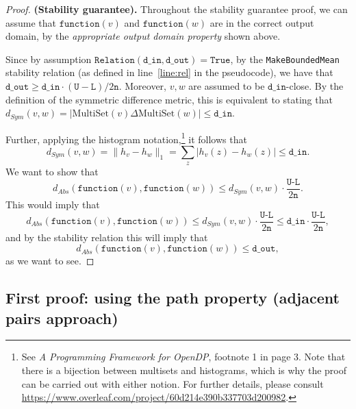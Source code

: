 \documentclass[11pt,a4paper]{article}
\theoremstyle{definition}
\newcommand{\MultiSet}{\mathrm{MultiSet}}
\newcommand{\din}{\texttt{d\_in}}
\newcommand{\dout}{\texttt{d\_out}}
\newcommand{\Relation}{\texttt{Relation}}
\newcommand{\U}{\texttt{U}}
\newcommand{\True}{\texttt{True}}
\newcommand{\function}{\texttt{function}}
\begin{document}
\begin{proof}
    \smallskip
    \textbf{(Stability guarantee).} Throughout the stability guarantee proof, we can assume that $\function(v)$ and $\function(w)$ are in the correct output domain, by the \textit{appropriate output domain property} shown above. 
    
    Since by assumption $\Relation(\din, \dout) = \True$, by the \texttt{MakeBoundedMean} stability relation (as defined in line~\ref{line:rel} in the pseudocode), we have that $\dout \geq \din \cdot (\U - \texttt{L})/2\texttt{n}$. Moreover, $v, w$ are assumed to be $\din$-close. By the definition of the symmetric difference metric, this is equivalent to stating that $d_{Sym}(v, w) = |\MultiSet(v) \Delta \MultiSet(w)| \leq \din$.

    Further, applying the histogram notation,\footnote{See \textit{A Programming Framework for OpenDP}, footnote 1 in page 3. Note that there is a bijection between multisets and histograms, which is why the proof can be carried out with either notion. For further details, please consult \url{https://www.overleaf.com/project/60d214e390b337703d200982}.}  it follows that
    \[
        d_{Sym}(v, w) = \lVert h_{v} - h_{w}\rVert_1 = \sum_z |h_v(z) - h_w(z)| \leq \din.
    \]
    We want to show that
    \[
        d_{Abs}(\function(v), \function(w)) \leq d_{Sym}(v, w) \cdot \dfrac{\texttt{U-L}}{2\texttt{n}}.
    \]
    This would imply that
    \begin{equation}\label{eq:abs1}
        d_{Abs}(\function(v), \function(w)) \leq d_{Sym}(v, w) \cdot \dfrac{\texttt{U-L}}{2\texttt{n}} \leq \din \cdot \dfrac{\texttt{U-L}}{2\texttt{n}},
    \end{equation}
    and by the stability relation this will imply that
    \begin{equation}\label{eq:abs2}
        d_{Abs}(\function(v), \function(w)) \leq \dout,
    \end{equation}
    as we want to see. 
\end{proof}


\subsection{First proof: using the path property (adjacent pairs approach)}
\end{document}
